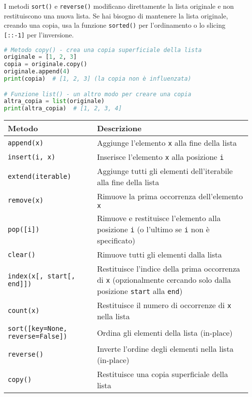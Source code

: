 \begin{nota}
I metodi \texttt{sort()} e \texttt{reverse()} modificano direttamente la lista originale e non restituiscono una nuova lista. Se hai bisogno di mantenere la lista originale, creando una copia, usa la funzione \texttt{sorted()} per l'ordinamento o lo slicing \texttt{[::-1]} per l'inversione.
\end{nota}



\begin{lstlisting}[language=Python]
# Metodo copy() - crea una copia superficiale della lista
originale = [1, 2, 3]
copia = originale.copy()
originale.append(4)
print(copia)  # [1, 2, 3] (la copia non è influenzata)

# Funzione list() - un altro modo per creare una copia
altra_copia = list(originale)
print(altra_copia)  # [1, 2, 3, 4]
\end{lstlisting}

\begin{tcolorbox}[colback=blue!5!white,colframe=blue!75!black,title=Riassunto dei metodi principali delle liste]
\begin{tabularx}{\textwidth}{|l|X|}
\hline
\textbf{Metodo} & \textbf{Descrizione} \\
\hline
\texttt{append(x)} & Aggiunge l'elemento \texttt{x} alla fine della lista \\
\hline
\texttt{insert(i, x)} & Inserisce l'elemento \texttt{x} alla posizione \texttt{i} \\
\hline
\texttt{extend(iterable)} & Aggiunge tutti gli elementi dell'iterabile alla fine della lista \\
\hline
\texttt{remove(x)} & Rimuove la prima occorrenza dell'elemento \texttt{x} \\
\hline
\texttt{pop([i])} & Rimuove e restituisce l'elemento alla posizione \texttt{i} (o l'ultimo se \texttt{i} non è specificato) \\
\hline
\texttt{clear()} & Rimuove tutti gli elementi dalla lista \\
\hline
\texttt{index(x[, start[, end]])} & Restituisce l'indice della prima occorrenza di \texttt{x} (opzionalmente cercando solo dalla posizione \texttt{start} alla \texttt{end}) \\
\hline
\texttt{count(x)} & Restituisce il numero di occorrenze di \texttt{x} nella lista \\
\hline
\texttt{sort([key=None, reverse=False])} & Ordina gli elementi della lista (in-place) \\
\hline
\texttt{reverse()} & Inverte l'ordine degli elementi nella lista (in-place) \\
\hline
\texttt{copy()} & Restituisce una copia superficiale della lista \\
\hline
\end{tabularx}
\end{tcolorbox}
\vspace{0.3cm}


